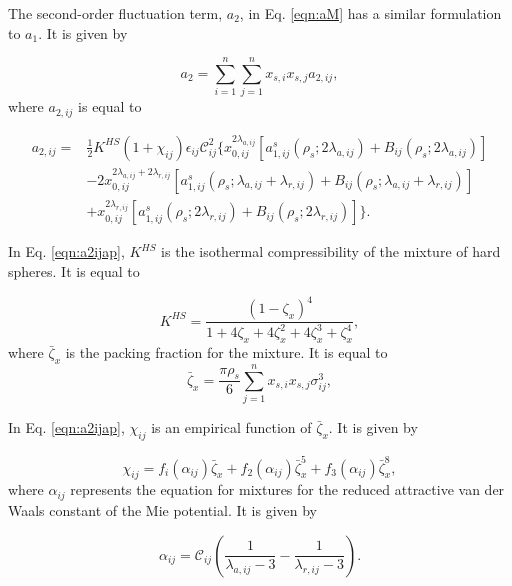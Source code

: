 The second-order fluctuation term, $a_{2}$, in Eq. \ref{eqn:aM} has a similar formulation to $a_{1}$. It is given by

\begin{equation}
a_{2} = \sum_{i=1}^{n} \sum_{j=1}^{n} x_{s,i} x_{s,j} a_{2,ij},
\end{equation}	
where $a_{2,ij}$ is equal to

\begin{equation}
\begin{aligned}
a_{2,ij} {}=&  \frac{1}{2} K^{HS} (1+ \chi_{ij}) \epsilon_{ij} \mathcal{C}_{ij}^2 \lbrace x_{0,ij}^{2\lambda _{a,ij}} [a_{1,ij}^{s}(\rho _{s}; 2\lambda _{a,ij}) + B_{ij}(\rho _{s}; 2\lambda _{a,ij})] \\
& - 2x_{0,ij}^{2\lambda _{a,ij} + 2\lambda _{r,ij}} [a_{1,ij}^{s}(\rho _{s}; \lambda _{a,ij} + \lambda _{r,ij}) + B_{ij}(\rho _{s}; \lambda _{a,ij} + \lambda _{r,ij})] \\
& +  x_{0,ij}^{2\lambda _{r,ij}} [a_{1,ij}^{s}(\rho _{s}; 2\lambda _{r,ij}) + B_{ij}(\rho _{s}; 2\lambda _{r,ij})] \rbrace.
\end{aligned}
\label{eqn:a2ijap}
\end{equation}

In Eq. \ref{eqn:a2ijap}, $K^{HS}$ is the isothermal compressibility of the mixture of hard spheres. It is equal to

\begin{equation}
K^{HS} = \dfrac{(1-\zeta_{x})^{4}}{1+4 \zeta_{x}+4 \zeta_{x}^{2}+4 \zeta_{x}^{3}+\zeta_{x}^{4}},
\end{equation}
where $\bar{\zeta}_{x}$ is the packing fraction for the mixture. It is equal to
\begin{equation}
\bar{\zeta}_{x} = \frac{\pi \rho _{s}}{6} \sum_{j=1}^{n} x_{s,i} x_{s,j} \sigma_{ij}^{3},
\end{equation}

In Eq. \ref{eqn:a2ijap}, $\chi_{ij}$ is an empirical function of $\bar{\zeta}_{x}$. It is given by

\begin{equation}
\chi_{ij} = f_{i}(\alpha_{ij}) \bar{\zeta}_{x} + f_{2}(\alpha_{ij}) \bar{\zeta}_{x}^{5} + f_{3}(\alpha_{ij}) \bar{\zeta}_{x}^{8},
\end{equation}
where $\alpha_{ij}$ represents the equation for mixtures for the reduced attractive van der Waals constant of the Mie potential. It is given by

\begin{equation}
\alpha_{ij} = \mathcal{C}_{ij} \left(\frac{1}{\lambda_{a,ij}-3} - \frac{1}{\lambda_{r,ij}-3} \right).
\end{equation}

